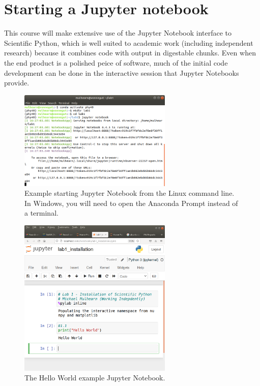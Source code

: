 \section{Starting a Jupyter notebook}

This course will make extensive use of the Jupyter Notebook interface
to Scientific Python, which is well suited to academic work (including
independent research) because it combines code with output in
digestable chunks.  Even when the end product is a polished peice of
software, much of the initial code development can be done in the interactive
session that Jupyter Notebooks provide.  

\begin{figure}[htbp]
\begin{center}
\includegraphics[width=0.65\textwidth]{figs/install/jupyter_startup.png} 
\caption{Example starting Jupyter Notebook from the Linux command line.  In Windows, you will need to open the Anaconda Prompt instead of a terminal.}
\label{fig:jupyterstartup}
\end{center}
\end{figure}

\begin{figure}[htbp]
\begin{center}
\includegraphics[width=0.65\textwidth]{figs/install/jupyter_window.png} 
\caption{The Hello World example Jupyter Notebook.}
\label{fig:jupyterwindow}
\end{center}
\end{figure}

